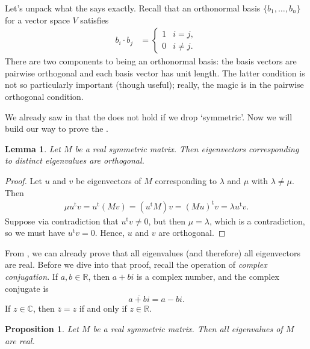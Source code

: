 \documentclass[a4paper, 12pt]{article}
\numberwithin{equation}{section}
\numberwithin{figure}{section}
\newtheorem{lem}[thm]{Lemma}
\newtheorem{prop}[thm]{Proposition}
\theoremstyle{definition}
\newcommand{\R}{\mathbb{R}}
\newcommand{\C}{\mathbb{C}}
\newcommand{\tr}{\mathrm{t}}
\begin{document}
Let's unpack what the  says exactly. Recall that an
orthonormal basis $\{b_1, \dots, b_n\}$ for a vector space $V$ satisfies 
\begin{align*}
	b_i \cdot b_j &= \begin{cases}
		1 & i = j, \\ 0 & i \neq j. 
	\end{cases}
\end{align*}
There are two components to being an orthonormal basis: the basis vectors are
pairwise orthogonal and each basis vector has unit length. The latter condition
is not so particularly important (though useful); really, the magic is in the
pairwise orthogonal condition. 

We already saw in  that the 
does not hold if we drop `symmetric'. Now we will build our way to prove the
. 

\begin{lem}\label{lem:distinct-ortho}
	Let $M$ be a real symmetric matrix. Then eigenvectors corresponding to
	distinct eigenvalues are orthogonal. 
\end{lem}

\begin{proof}
	Let $u$ and $v$ be eigenvectors of $M$ corresponding to $\lambda$ and $\mu$
	with $\lambda\neq \mu$. Then 
	\begin{align*}
		\mu u^{\tr} v = u^{\tr}(M v) = (u^{\tr}M)v = (Mu)^{\tr}v = \lambda u^{\tr}v. 
	\end{align*}
	Suppose via contradiction that $u^{\tr} v \neq 0$, but then $\mu=\lambda$,
	which is a contradiction, so we must have $u^{\tr} v = 0$. Hence, $u$ and
	$v$ are orthogonal.
\end{proof}

From , we can already prove that all eigenvalues (and
therefore) all eigenvectors are real. Before we dive into that proof, recall the
operation of \textit{complex conjugation}. If $a,b\in \R$, then $a + bi$ is a
complex number, and the complex conjugate is 
\[ 
	\overline{a + bi} = a - bi.
\] 
If $z\in \C$, then $\overline{z} = z$ if and only if $z\in \R$.

\begin{prop}\label{prop:real-evals}
	Let $M$ be a real symmetric matrix. Then all eigenvalues of $M$ are real.
\end{prop}
\end{document}
